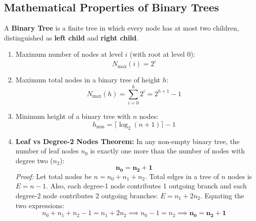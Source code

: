 \documentclass[12pt,a4paper]{article}
\begin{document}
\subsection{Mathematical Properties of Binary Trees}
A \textbf{Binary Tree} is a finite tree in which every node has at most two children, distinguished as \textbf{left child} and \textbf{right child}.
\begin{tcolorbox}[formulabox, title={\textbf{Core Mathematical Theorems on Binary Trees}}]
\begin{enumerate}[leftmargin=*, itemsep=3pt]
  \item Maximum number of nodes at level $i$ (with root at level 0):
  \begin{equation}
    N_{\max}(i) = 2^i
  \end{equation}
  \item Maximum total nodes in a binary tree of height $h$:
  \begin{equation}
    N_{\max}(h) = \sum_{i=0}^h 2^i = 2^{h+1} - 1
  \end{equation}
  \item Minimum height of a binary tree with $n$ nodes:
  \begin{equation}
    h_{\min} = \lceil \log_2(n + 1) \rceil - 1
  \end{equation}
  \item \textbf{Leaf vs Degree-2 Nodes Theorem:} In any non-empty binary tree, the number of leaf nodes $n_0$ is exactly one more than the number of nodes with degree two ($n_2$):
  \begin{equation}
    \mathbf{n_0 = n_2 + 1}
  \end{equation}
  \textit{Proof:} Let total nodes be $n = n_0 + n_1 + n_2$. Total edges in a tree of $n$ nodes is $E = n - 1$. Also, each degree-1 node contributes 1 outgoing branch and each degree-2 node contributes 2 outgoing branches: $E = n_1 + 2n_2$. Equating the two expressions:
  \begin{equation*}
    n_0 + n_1 + n_2 - 1 = n_1 + 2n_2 \implies n_0 - 1 = n_2 \implies \mathbf{n_0 = n_2 + 1}
  \end{equation*}
\end{enumerate}
\end{tcolorbox}
\end{document}
